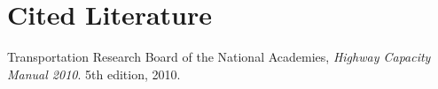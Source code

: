 \documentclass{report}
\begin{document}
\noindent
\section*{Cited Literature}

\begin{thebibliography}{9}
    Transportation Research Board of the National Academies,
    \emph{Highway Capacity Manual 2010}.
    5th edition,
    2010.
\end{thebibliography}
\end{document}
